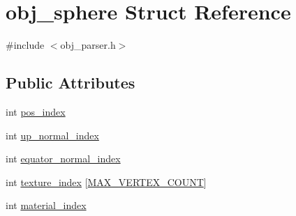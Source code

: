\hypertarget{structobj__sphere}{\section{obj\+\_\+sphere Struct Reference}
\label{structobj__sphere}
}


{\ttfamily \#include $<$obj\+\_\+parser.\+h$>$}

\subsection*{Public Attributes}
\begin{DoxyCompactItemize}
\item 
int \hyperlink{structobj__sphere_a15fd097586d7b88ac867b4f0ef5bfa8b}{pos\+\_\+index}
\item 
int \hyperlink{structobj__sphere_a1bd3b2af2191462e31f8a2a7d7a9105e}{up\+\_\+normal\+\_\+index}
\item 
int \hyperlink{structobj__sphere_aeefc59c5cf2a8182c9065c8be98a1822}{equator\+\_\+normal\+\_\+index}
\item 
int \hyperlink{structobj__sphere_a14cbe08a18e529415cc1166e4f27ff8d}{texture\+\_\+index} \mbox{[}\hyperlink{obj__parser_8h_acbf8be5cb832d11ce1584c3024d2a569}{M\+A\+X\+\_\+\+V\+E\+R\+T\+E\+X\+\_\+\+C\+O\+U\+N\+T}\mbox{]}
\item 
int \hyperlink{structobj__sphere_a426a609cef880851545e56ffd220ed35}{material\+\_\+index}
\end{DoxyCompactItemize}


